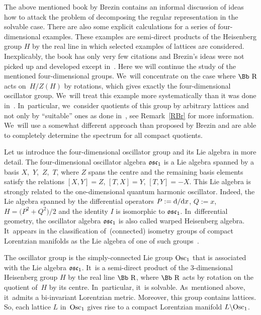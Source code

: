 \documentclass[pdftex]{sigma}
\newcommand\RR{{\mbox{\Bb R}}}
\newcommand\osc{\frak o \frak s \frak c}
\newcommand{\Osc}{{\rm Osc}}
\numberwithin{equation}{section}
\begin{document}
The above mentioned book by Brezin contains an informal discussion of ideas how to attack the problem of decomposing the regular representation in the solvable case. There are also some explicit calculations for a series of four-dimensional examples. These examples are semi-direct products of the Heisenberg group $H$ by the real line in which selected examples of lattices are considered. Inexplicably, the book has only very few citations and Brezin's ideas were not picked up and developed except in~\cite{Hu}. Here we will continue the study of the mentioned four-dimensional groups. We~will concentrate on the case where $\RR$ acts on~$H/Z(H)$ by rotations, which gives exactly the four-dimensional oscillator group. We~will treat this example more systematically than it was done in~\cite{Br}. In~particular, we~consider quotients of this group by arbitrary lattices and not only by ``suitable'' ones as done in~\cite{Br}, see Remark~\ref{RBr} for more information. We~will use a somewhat different approach than proposed by Brezin and are able to completely determine the spectrum for all compact quotients.

Let us introduce the four-dimensional oscillator group and its Lie algebra in more detail. The four-dimensional oscillator algebra $\osc_1$ is a Lie algebra spanned by a basis $X$,~$Y$,~$Z$,~$T$, where $Z$ spans the centre and the remaining basis elements satisfy the relations $[X,Y]=Z$, $[T,X]=Y$, $[T,Y]=-X$. This Lie algebra is strongly related to the one-dimensional quantum harmonic oscillator. Indeed, the Lie algebra spanned by the differential operators $P:={\rm d}/{\rm d}x$, \mbox{$Q:=x$}, $H=\big(P^2+Q^2\big)/2$ and the identity $I$ is isomorphic to $\osc_1$. In~differential geometry, the oscillator algebra $\osc_1$ is also called warped Heisenberg algebra. It~appears in the classification of~(con\-nected) isometry groups of compact Lorentzian manifolds as the Lie algebra of one of such groups~\cite{Z98}.

The oscillator group is the simply-connected Lie group $\Osc_1$ that is associated with the Lie algebra $\osc_1$. It~is a semi-direct product of the 3-dimensional Heisenberg group $H$ by the real line $\RR$, where $\RR$ acts by rotation on the quotient of~$H$ by its centre. In~particular, it~is solvable. As~mentioned above, it~admits a bi-invariant Lorentzian metric. Moreover, this group contains lattices. So, each lattice $L$ in~$\Osc_1$ gives rise to a compact Lorentzian manifold $L\backslash \Osc_1$.
\end{document}
